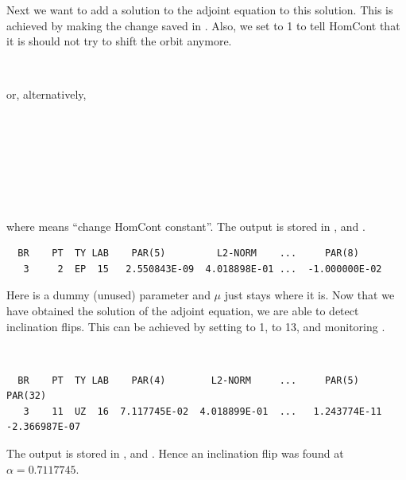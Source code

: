 Next we want to add a solution to the adjoint equation to this
solution. This is achieved by making the change 
saved in . Also, we set  to 1 to tell 
{\cal HomCont} that it is should not try to shift the orbit anymore.
\begin{center}
 \\
\end{center}
or, alternatively,
\begin{center}
\\
\\
\\
\\
\\
\\
\end{center}
where  means ``change {\cal HomCont} constant''.
The output is stored in ,   and .
\begin{verbatim}
  BR    PT  TY LAB    PAR(5)         L2-NORM    ...     PAR(8)     
   3     2  EP  15   2.550843E-09  4.018898E-01 ...  -1.000000E-02
\end{verbatim}
Here  is a dummy (unused) parameter and $\mu$ just stays where
it is. Now that we have obtained the solution of the adjoint equation,
we are able to detect inclination flips. This can be achieved by
setting  to 1,  to 13, and monitoring .
\begin{center}
 \\
\end{center} 
\begin{verbatim}
  BR    PT  TY LAB    PAR(4)        L2-NORM     ...     PAR(5)        PAR(32) 
   3    11  UZ  16  7.117745E-02  4.018899E-01  ...   1.243774E-11 -2.366987E-07
\end{verbatim}   
The output is stored in ,   and .
Hence an inclination flip was found at $\alpha=0.7117745$.

